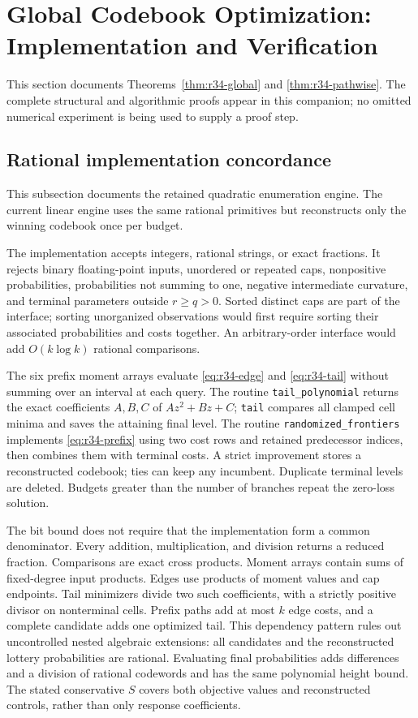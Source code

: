 \section{Global Codebook Optimization: Implementation and Verification}\label{sec:ec-r34}
This section documents Theorems~\ref{thm:r34-global} and \ref{thm:r34-pathwise}. The complete structural and algorithmic proofs appear in this companion; no omitted numerical experiment is being used to supply a proof step.

\subsection{Rational implementation concordance}
This subsection documents the retained quadratic enumeration engine. The current linear engine uses the same rational primitives but reconstructs only the winning codebook once per budget.

The implementation accepts integers, rational strings, or exact fractions. It rejects binary floating-point inputs, unordered or repeated caps, nonpositive probabilities, probabilities not summing to one, negative intermediate curvature, and terminal parameters outside $r\geq q>0$. Sorted distinct caps are part of the interface; sorting unorganized observations would first require sorting their associated probabilities and costs together. An arbitrary-order interface would add $O(k\log k)$ rational comparisons.

The six prefix moment arrays evaluate \eqref{eq:r34-edge} and \eqref{eq:r34-tail} without summing over an interval at each query. The routine \texttt{tail\_polynomial} returns the exact coefficients $A,B,C$ of $Az^2+Bz+C$; \texttt{tail} compares all clamped cell minima and saves the attaining final level. The routine \texttt{randomized\_frontiers} implements \eqref{eq:r34-prefix} using two cost rows and retained predecessor indices, then combines them with terminal costs. A strict improvement stores a reconstructed codebook; ties can keep any incumbent. Duplicate terminal levels are deleted. Budgets greater than the number of branches repeat the zero-loss solution.

The bit bound does not require that the implementation form a common denominator. Every addition, multiplication, and division returns a reduced fraction. Comparisons are exact cross products. Moment arrays contain sums of fixed-degree input products. Edges use products of moment values and cap endpoints. Tail minimizers divide two such coefficients, with a strictly positive divisor on nonterminal cells. Prefix paths add at most $k$ edge costs, and a complete candidate adds one optimized tail. This dependency pattern rules out uncontrolled nested algebraic extensions: all candidates and the reconstructed lottery probabilities are rational. Evaluating final probabilities adds differences and a division of rational codewords and has the same polynomial height bound. The stated conservative $S$ covers both objective values and reconstructed controls, rather than only response coefficients.

